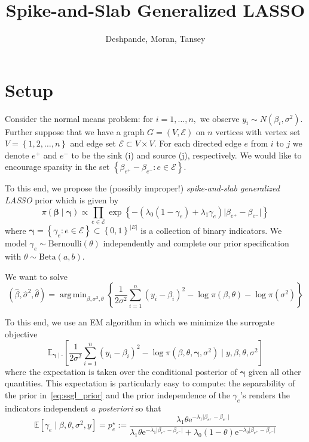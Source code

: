 \documentclass[12pt]{article}
\title{Spike-and-Slab Generalized LASSO}
\author{Deshpande, Moran, Tansey}
\DeclareMathOperator*{\argmin}{arg\,min}
\def\bbeta{\boldsymbol{\beta}}
\def\bgamma{\boldsymbol{\gamma}}
\def\E{\mathbb{E}}
\begin{document}
\section{Setup}

Consider the normal means problem: for $i = 1, \ldots, n,$ we observe $y_{i} \sim N(\beta_{i},\sigma^{2}).$
Further suppose that we have a graph $G = (V,\mathcal{E})$ on $n$ vertices with vertex set $V = \left\{1,2, \ldots, n \right\}$ and edge set $\mathcal{E} \subset V \times V.$
For each directed edge $e$ from $i$ to $j$ we denote $e^{+}$ and $e^{-}$ to be the sink (i) and source (j), respectively.
We would like to encourage sparsity in the set $\left\{\beta_{e^{+}} - \beta_{e^{-}}: e \in \mathcal{E}\right\}.$

To this end, we propose the (possibly improper!) \emph{spike-and-slab generalized LASSO} prior which is given by
\begin{equation}
\label{eq:ssgl_prior}
\pi(\bbeta \mid \bgamma) \propto \prod_{e \in \mathcal{E}}{\exp\left\{-\left(\lambda_{0}(1 - \gamma_{e}) + \lambda_{1}\gamma_{e}\right) \lvert \beta_{e^{+}} - \beta_{e^{-}} \rvert \right\}}
\end{equation}
where $\bgamma = \left\{\gamma_{e} : e \in \mathcal{E}\right\} \subset \left\{0,1\right\}^{\lvert E \rvert}$ is a collection of binary indicators.
We model $\gamma_{e} \sim \text{Bernoulli}(\theta)$ independently and complete our prior specification with $\theta \sim \text{Beta}(a,b).$

We want to solve
$$
(\hat{\beta}, \hat{\sigma}^{2}, \hat{\theta}) = \argmin_{\beta, \sigma^{2}, \theta}\left\{\frac{1}{2\sigma^{2}}\sum_{i = 1}^{n}{(y_{i} - \beta_{i})^{2}} - \log{\pi(\beta, \theta)} - \log{\pi(\sigma^{2})}\right\}
$$

To this end, we use an EM algorithm in which we minimize the surrogate objective 
$$
\E_{\bgamma \mid \cdot}\left[\frac{1}{2\sigma^{2}}\sum_{i = 1}^{n}{(y_{i} - \beta_{i})^{2}} - \log{\pi(\beta, \theta, \bgamma, \sigma^{2})} \mid y, \beta, \theta, \sigma^{2}\right]
$$
where the expectation is taken over the conditional posterior of $\bgamma$ given all other quantities.
This expectation is particularly easy to compute: the separability of the prior in~\eqref{eq:ssgl_prior} and the prior independence of the $\gamma_{e}$'s renders the indicators independent \textit{a posteriori} so that
$$
\E[\gamma_{e} \mid \beta, \theta, \sigma^{2}, y] = p_{e}^{\star} :=  \frac{\lambda_{1}\theta \text{e}^{-\lambda_{1}\lvert \beta_{e^{+}} - \beta_{e^{-}}\rvert}}{\lambda_{1}\theta \text{e}^{-\lambda_{1}\lvert \beta_{e^{+}} - \beta_{e^{-}}\rvert} + \lambda_{0}(1 - \theta) \text{e}^{-\lambda_{0}\lvert \beta_{e^{+}} - \beta_{e^{-}}\rvert}}
$$ 
\end{document}
